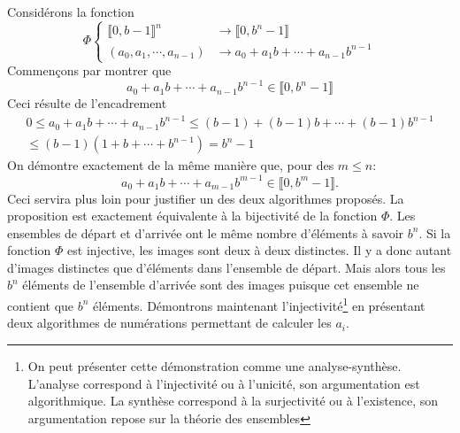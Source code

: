 Considérons la fonction
\begin{displaymath}
 \Phi\left\lbrace 
\begin{aligned}
\llbracket 0 , b-1 \rrbracket^n &\rightarrow \llbracket 0 , b^n-1\rrbracket \\
(a_0,a_1,\cdots,a_{n-1}) &\rightarrow a_0 + a_1 b +\cdots +a_{n-1}b^{n-1} 
\end{aligned}
\right.
\end{displaymath}
Commençons par montrer que
\begin{displaymath}
 a_0 + a_1 b +\cdots +a_{n-1}b^{n-1}\in \llbracket 0,b^n-1\rrbracket
\end{displaymath}
Ceci résulte de l'encadrement
\begin{multline*}
 0\leq a_0 + a_1 b +\cdots +a_{n-1}b^{n-1} 
\leq (b-1) + (b-1) b +\cdots +(b-1)b^{n-1}\\
\leq (b-1)(1+b+\cdots +b^{n-1})=b^n-1
\end{multline*}
On démontre exactement de la même manière que, pour des $m\leq n$:
\begin{displaymath}
 a_0 + a_1 b +\cdots +a_{m-1}b^{m-1}\in \llbracket 0 , b^m-1\rrbracket.
\end{displaymath}
Ceci servira plus loin pour justifier un des deux algorithmes proposés.\newline
La proposition est exactement équivalente à la bijectivité de la fonction $\Phi$. Les ensembles de départ et d'arrivée ont le même nombre d'éléments à savoir $b^n$.\newline
Si la fonction $\Phi$ est injective, les images sont deux à deux distinctes. Il y a donc autant d'images distinctes que d'éléments dans l'ensemble de départ. Mais alors tous les $b^n$ éléments de l'ensemble d'arrivée sont des images puisque cet ensemble ne contient que $b^n$ éléments.\newline
Démontrons maintenant l'injectivité\footnote{On peut présenter cette démonstration comme une analyse-synthèse. L'analyse correspond à l'injectivité ou à l'unicité, son argumentation est algorithmique. La synthèse correspond à la surjectivité ou à l'existence, son argumentation repose sur la théorie des ensembles} en présentant deux algorithmes de numérations permettant de calculer les $a_i$. 

